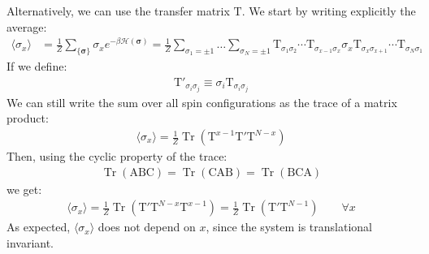 \documentclass[12pt,a4paper]{report}
\begin{document}
\begin{enumerate}
        Alternatively, we can use the transfer matrix $\mathrm{T}$. We start by writing explicitly the average:
        \begin{align*}
            \langle \sigma_x \rangle &= \frac{1}{Z} \sum_{\{\bm{\sigma}\}} \sigma_x e^{-\beta \mathcal{H}(\bm{\sigma})} = \frac{1}{Z} \sum_{\sigma_1 = \pm 1} \dots \sum_{\sigma_N = \pm 1} \mathrm{T}_{\sigma_1 \sigma_2} \cdots \mathrm{T}_{\sigma_{x-1} \sigma_x} \sigma_x \mathrm{T}_{\sigma_x \sigma_{x+1}} \cdots \mathrm{T}_{\sigma_N \sigma_1}  
        \end{align*}
        If we define:
        \begin{align}\label{eqn:T-prime}
            \mathrm{T}'_{\sigma_i \sigma_j} \equiv \sigma_{i} \mathrm{T}_{\sigma_i \sigma_j} 
        \end{align}
        We can still write the sum over all spin configurations as the trace of a matrix product:
        \begin{align*}
            \langle \sigma_x \rangle = \frac{1}{Z} \operatorname{Tr}(\mathrm{T}^{x-1} \mathrm{T}' \mathrm{T}^{N-x}) 
        \end{align*}
        Then, using the cyclic property of the trace:
        \begin{align*}
            \operatorname{Tr}(\mathrm{A} \mathrm{B} \mathrm{C}) = \operatorname{Tr}(\mathrm{C} \mathrm{A} \mathrm{B}) = \operatorname{Tr}(\mathrm{B}\mathrm{C}\mathrm{A})   
        \end{align*}
        we get:
        \begin{align*}
            {\langle \sigma_x \rangle} = \frac{1}{Z} \operatorname{Tr} (\mathrm{T}' \mathrm{T}^{N-x} \mathrm{T}^{x-1}) = \frac{1}{Z} \operatorname{Tr}(\mathrm{T}' \mathrm{T}^{N-1}) \qquad \forall x
        \end{align*}
        As expected, $\langle \sigma_x \rangle$ does not depend on $x$, since the system is translational invariant.

        \medskip


\end{enumerate}
\end{document}
